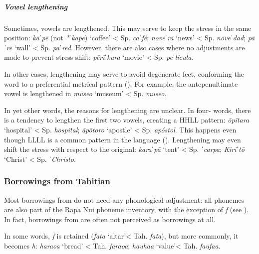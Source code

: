 \subparagraph{Vowel lengthening} Sometimes, vowels are lengthened. This may serve to keep the stress in the same position: \textit{kā}ˈ\textit{pē} (not \textit{*}\textit{ˈ}\textit{kape}) ‘coffee’ {\textless} Sp. \textit{ca}ˈ\textit{fé}; \textit{nove}ˈ\textit{rā} ‘news’ {\textless} Sp. \textit{nove}ˈ\textit{dad}; \textit{pā}ˈ\textit{rē} ‘wall’ {\textless} Sp. \textit{pa}ˈ\textit{red}. However, there are also cases where no adjustments are made to prevent stress shift: \textit{pērī}ˈ\textit{kura} ‘movie’ {\textless} Sp. \textit{pe}ˈ\textit{lícula}.

In other cases, lengthening may serve to avoid degenerate feet, conforming the word to a preferential metrical pattern (). For example, the antepenultimate vowel is lengthened in \textit{mūseo} ‘museum’ {\textless} Sp. \textit{museo}. 

In yet other words, the reasons for lengthening are unclear. In four- words, there is a tendency to lengthen the first two vowels, creating a HHLL pattern: \textit{{\ꞌ}ōpītara} ‘hospital’ {\textless} Sp. \textit{hospital}; \textit{{\ꞌ}āpōtoro} ‘apostle’ {\textless} Sp. \textit{apóstol}. This happens even though LLLL is a common pattern in the language (). Lengthening may even shift the stress with respect to the  original: \textit{kara}ˈ\textit{pā} ‘tent’ {\textless} Sp. ˈ\textit{carpa}; \textit{Kiri}ˈ\textit{tō} ‘Christ’ {\textless} Sp. ˈ\textit{Christo}. 

\subsubsection[Borrowings from \ili{Tahitian}]{Borrowings from Tahitian}\label{sec:2.5.3.2}
Most borrowings from  do not need any phonological adjustment: all  phonemes are also part of the Rapa Nui phoneme inventory, with the exception of \textit{f} (see ). In fact, borrowings from  are often not perceived as borrowings at all. 

In some words, \textit{f} is retained (\textit{fata} ‘altar’{\textless} Tah. \textit{fata}), but more commonly, it becomes \textit{h}: \textit{haraoa} ‘bread’ {\textless} Tah. \textit{faraoa}; \textit{hauha}\textit{{\ꞌ}a} ‘value’{\textless} Tah. \textit{faufa{\ꞌ}a}.

